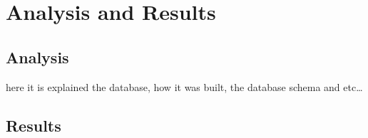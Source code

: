 

\chapter{Analysis and Results} \label{chap4:analysis_results}

\section{Analysis} \label{sec4:analysis}
here it is explained the database, how it was built, the database schema and etc\ldots


\section{Results} \label{sec4:results}
